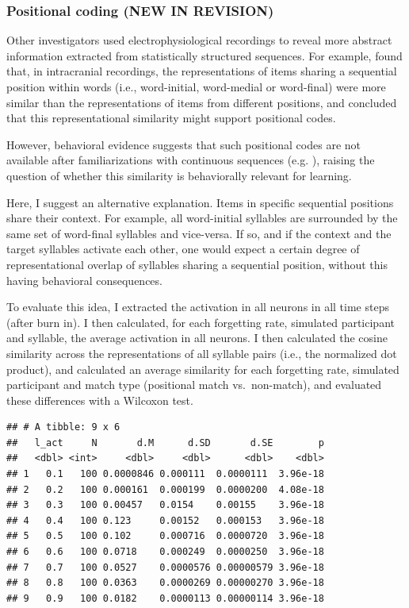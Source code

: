 \documentclass[
]{article}
\begin{document}
\clearpage

\hypertarget{positional-coding-new-in-revision}{%
\subsubsection{Positional coding (NEW IN
REVISION)}\label{positional-coding-new-in-revision}}

Other investigators used electrophysiological recordings to reveal more
abstract information extracted from statistically structured sequences.
For example, \citep{Henin2021} found that, in intracranial recordings,
the representations of items sharing a sequential position within words
(i.e., word-initial, word-medial or word-final) were more similar than
the representations of items from different positions, and concluded
that this representational similarity might support positional codes.

However, behavioral evidence suggests that such positional codes are not
available after familiarizations with continuous sequences (e.g.
\citep{Marchetto2013, Endress-AXC, Endress-AXC-Edge, Endress-AXC-Review, Pena2002}),
raising the question of whether this similarity is behaviorally relevant
for learning.

Here, I suggest an alternative explanation. Items in specific sequential
positions share their context. For example, all word-initial syllables
are surrounded by the same set of word-final syllables and vice-versa.
If so, and if the context and the target syllables activate each other,
one would expect a certain degree of representational overlap of
syllables sharing a sequential position, without this having behavioral
consequences.

To evaluate this idea, I extracted the activation in all neurons in all
time steps (after burn in). I then calculated, for each forgetting rate,
simulated participant and syllable, the average activation in all
neurons. I then calculated the cosine similarity across the
representations of all syllable pairs (i.e., the normalized dot
product), and calculated an average similarity for each forgetting rate,
simulated participant and match type (positional match vs.~non-match),
and evaluated these differences with a Wilcoxon test.

\begin{verbatim}
## # A tibble: 9 x 6
##   l_act     N       d.M      d.SD       d.SE        p
##   <dbl> <int>     <dbl>     <dbl>      <dbl>    <dbl>
## 1   0.1   100 0.0000846 0.000111  0.0000111  3.96e-18
## 2   0.2   100 0.000161  0.000199  0.0000200  4.08e-18
## 3   0.3   100 0.00457   0.0154    0.00155    3.96e-18
## 4   0.4   100 0.123     0.00152   0.000153   3.96e-18
## 5   0.5   100 0.102     0.000716  0.0000720  3.96e-18
## 6   0.6   100 0.0718    0.000249  0.0000250  3.96e-18
## 7   0.7   100 0.0527    0.0000576 0.00000579 3.96e-18
## 8   0.8   100 0.0363    0.0000269 0.00000270 3.96e-18
## 9   0.9   100 0.0182    0.0000113 0.00000114 3.96e-18
\end{verbatim}
\end{document}
